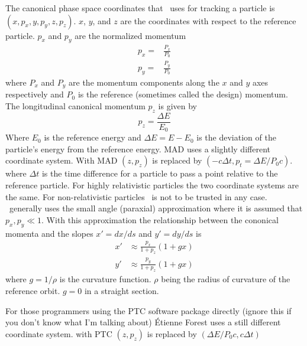 The canonical phase space coordinates that \bmad\ uses for tracking a
particle is $(x, p_x, y, p_y, z, p_z)$. $x$, $y$, and $z$ are the
coordinates with respect to the reference particle. $p_x$ and $p_y$
are the normalized momentum
\begin{align}
  p_x = &\frac{P_x}{P_0} \\
  p_y = &\frac{P_y}{P_0}
\end{align}
where $P_x$ and $P_y$ are the momentum components along the $x$ and
$y$ axes respectively and $P_0$ is the reference (sometimes called the
design) momentum. The longitudinal canonical momentum $p_z$ is given by
\begin{equation}
  p_z = \frac{\Delta E}{E_0}
\end{equation}
Where $E_0$ is the reference energy and $\Delta E = E - E_0$ is the
deviation of the particle's energy from the reference energy. MAD uses
a slightly different coordinate system. With MAD $(z, p_z)$ is
replaced by $(-c\Delta t, p_t = \Delta E / P_0 c)$. where $\Delta t$
is the time difference for a particle to pass a point relative to the
reference particle. For highly relativistic particles the two
coordinate systems are the same. For non-relativistic particles \bmad\
is not to be trusted in any case. \bmad\ generally uses the small angle
(paraxial) approximation where it is assumed that $p_x, p_y \ll 1$. With this
approximation the relationship between the cononical momenta and the
slopes $x' = dx/ds$ and $y' = dy/ds$ is
\begin{align}
  x' &\approx \frac{p_x}{1 + p_z} (1 + g x) \\
  y' &\approx \frac{p_y}{1 + p_z} (1 + g x) 
\end{align}
where $g = 1/\rho$ is the curvature function. $\rho$ being the radius
of curvature of the reference orbit. $g = 0$ in a straight section.

For those programmers using the PTC software package directly (ignore
this if you don't know what I'm talking about) \'Etienne Forest uses a still
different coordinate system. with PTC $(z, p_z)$ is replaced by
$(\Delta E/P_0 c, c \Delta t)$